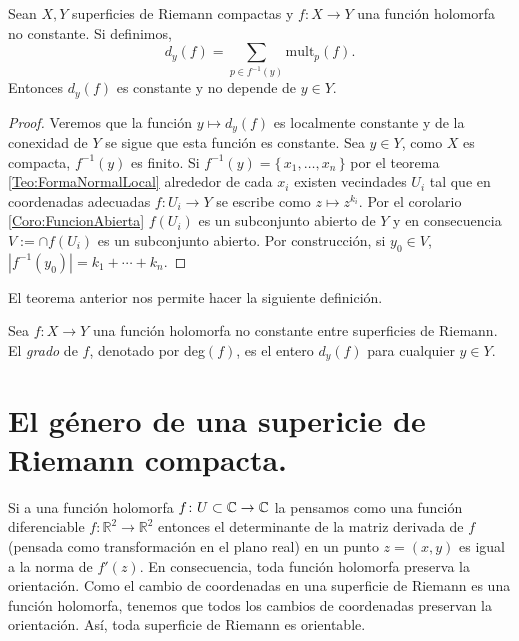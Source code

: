 \begin{Teorema}
\label{Teo:GradoDeUnaFuncionEntreSuperficiesDeRiemann}
Sean $X,Y$ superficies de Riemann compactas y $f\colon X\rightarrow Y$ una función holomorfa no constante. Si definimos,
\begin{equation*}
d_{y}(f)=\sum_{p\in f^{-1}(y)}\mathrm{mult}_{p}(f).
\end{equation*}
Entonces $d_{y}(f)$ es constante y no depende de $y\in Y$.
\end{Teorema}
\begin{proof}
Veremos que la función $y\mapsto d_{y}(f)$ es localmente constante y de la conexidad de $Y$ se sigue que esta función es constante. Sea $y\in Y$, como $X$ es compacta, $f^{-1}(y)$ es finito. Si $f^{-1}(y)=\{\,x_{1},\ldots,x_{n} \, \}$ por el teorema \ref{Teo:FormaNormalLocal} alrededor de cada $x_{i}$ existen vecindades $U_{i}$ tal que en coordenadas adecuadas $f\colon U_{i}\rightarrow Y$ se escribe como $z\mapsto z^{k_{i}}$. Por el corolario \ref{Coro:FuncionAbierta} $f(U_{i})$ es un subconjunto abierto de $Y$ y en consecuencia $V:=\cap f(U_{i})$ es un subconjunto abierto. Por construcción, si $y_{0}\in V$, $|f^{-1}(y_{0})|=k_{1}+\cdots +k_{n}$. 
\end{proof}

El teorema anterior nos permite hacer la siguiente definición.

\begin{defn}
\label{Def:GradoDeUnaFuncionEntreSuperficiesDeRiemann}
Sea $f\colon X\rightarrow Y$ una función holomorfa no constante entre superficies de Riemann. El \emph{grado} de $f$, denotado por deg$(f)$, es el entero $d_{y}(f)$ para cualquier $y\in Y$.
\end{defn}

\section{El género de una supericie de Riemann compacta.}

Si a una función holomorfa $f\colon U\subset\mathbb{C}\rightarrow\mathbb{C}$ la pensamos como una función diferenciable $f\colon\mathbb{R}^{2}\rightarrow\mathbb{R}^{2}$ entonces el determinante de la matriz derivada de $f$ (pensada como transformación en el plano real) en un punto $z=(x,y)$ es igual a la norma de $f'(z)$. En consecuencia, toda función holomorfa preserva la orientación. Como el cambio de coordenadas en una superficie de Riemann es una función holomorfa, tenemos que todos los cambios de coordenadas preservan la orientación. Así, toda superficie de Riemann es orientable.

